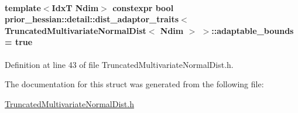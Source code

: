 \paragraph[{\texorpdfstring{adaptable\+\_\+bounds}{adaptable_bounds}}]{\setlength{\rightskip}{0pt plus 5cm}template$<$IdxT Ndim$>$ constexpr bool {\bf prior\+\_\+hessian\+::detail\+::dist\+\_\+adaptor\+\_\+traits}$<$ {\bf Truncated\+Multivariate\+Normal\+Dist}$<$ Ndim $>$ $>$\+::adaptable\+\_\+bounds = true\hspace{0.3cm}{\ttfamily [static]}}\hypertarget{structprior__hessian_1_1detail_1_1dist__adaptor__traits_3_01TruncatedMultivariateNormalDist_3_01Ndim_01_4_01_4_a5a7a73e24a925a4e7696ff7259f855c5}{}\label{structprior__hessian_1_1detail_1_1dist__adaptor__traits_3_01TruncatedMultivariateNormalDist_3_01Ndim_01_4_01_4_a5a7a73e24a925a4e7696ff7259f855c5}


Definition at line 43 of file Truncated\+Multivariate\+Normal\+Dist.\+h.



The documentation for this struct was generated from the following file\+:\begin{DoxyCompactItemize}
\item 
\hyperlink{TruncatedMultivariateNormalDist_8h}{Truncated\+Multivariate\+Normal\+Dist.\+h}\end{DoxyCompactItemize}
